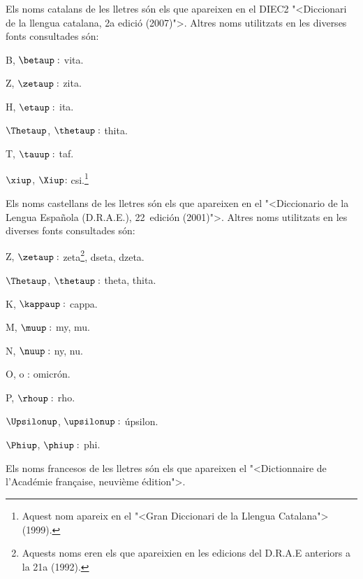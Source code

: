 Els noms catalans de les lletres s\'{o}n els que apareixen en el DIEC2 {"<}Diccionari de la llengua catalana, 2a edici\'{o} (2007){">}. Altres noms utilitzats en
les diverses fonts consultades s\'{o}n:
\begin{multicols}{3}
\begin{list}{}
   {\setlength{\labelwidth}{16mm} \setlength{\leftmargin}{16mm} \setlength{\labelsep}{2mm}}
   \item[B, $\betaup :$] vita.
   \item[Z, $\zetaup :$] zita.
   \item[H, $\etaup :$] ita.
   \item[$\Thetaup$, $\thetaup :$] thita.
   \item[T, $\tauup :$] taf.
   \item[$\xiup$, $\Xiup$:] csi.\footnote{Aquest nom apareix en el {"<}Gran Diccionari de la Llengua Catalana{">} (1999).}
\end{list}
\end{multicols}

Els noms castellans de les lletres s\'{o}n els que apareixen en el
{"<}Diccionario de la Lengua Espa\~{n}ola (D.R.A.E.), 22\textordfeminine\
edici\'{o}n (2001){">}. Altres noms utilitzats en les diverses fonts
consultades s\'{o}n:
\begin{multicols}{3}
\begin{list}{}
   {\setlength{\labelwidth}{16mm} \setlength{\leftmargin}{16mm} \setlength{\labelsep}{2mm}}
   \item[Z, $\zetaup :$] zeta\footnote{Aquests noms eren els que apareixien en les edicions
   del D.R.A.E anteriors a la 21a (1992).}, dseta, dzeta.
   \item[$\Thetaup$, $\thetaup :$] theta\footnotemark[2], thita.
   \item[K, $\kappaup :$] cappa.
   \item[M, $\muup :$] my\footnotemark[2], mu.
   \item[N, $\nuup :$] ny\footnotemark[2], nu.
   \item[O, o :] omicr\'{o}n.
   \item[P, $\rhoup :$] rho.
   \item[$\Upsilonup$, $\upsilonup :$] \'{u}psilon.
   \item[$\Phiup$, $\phiup :$] phi.
\end{list}
\end{multicols}

Els noms francesos de les lletres s\'{o}n els que apareixen el {"<}Dictionnaire de l'Acad\'{e}mie fran\c{c}aise, neuvi\`{e}me \'{e}dition{">}.